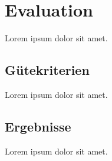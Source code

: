 \section{Evaluation}\raggedbottom
Lorem ipsum dolor sit amet.
\subsection{Gütekriterien}
Lorem ipsum dolor sit amet.\pagebreak\pagebreak
\subsection{Ergebnisse}
Lorem ipsum dolor sit amet.